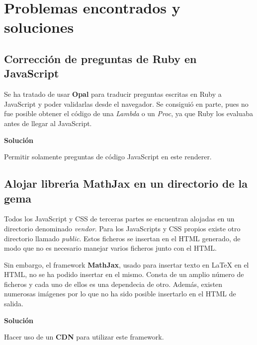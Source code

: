 \section{Problemas encontrados y soluciones}
\label{4:sec:1}

\subsection{Correcci\'on de preguntas de Ruby en JavaScript}
\label{subsec:4.1.2}
\bigskip

Se ha tratado de usar {\bfseries Opal} para traducir preguntas escritas en Ruby a JavaScript y poder validarlas desde el navegador.
Se consigui\'o en parte, pues no fue posible obtener el c\'odigo de una \textit{Lambda} o un \textit{Proc}, ya que Ruby los evaluaba antes de llegar al
JavaScript.
\bigskip

{\normalsize {\bfseries Soluci\'on}}
\bigskip

Permitir solamente preguntas de c\'odigo JavaScript en este renderer.

\subsection{Alojar librer\'{\i}a MathJax en un directorio de la gema}
\label{subsec:4.1.3}
\bigskip

Todos los JavaScript y CSS de terceras partes se encuentran alojadas en un directorio denominado \textit{vendor}. Para los JavaScripts y CSS
propios existe otro directorio llamado \textit{public}. Estos ficheros se insertan en el HTML generado, de modo que no es necesario manejar varios
ficheros junto con el HTML. 

Sin embargo, el framework {\bfseries MathJax}, usado para insertar texto en LaTeX en el HTML, no se ha podido insertar en el mismo. Consta de un
amplio n\'umero de ficheros y cada uno de ellos es una dependecia de otro. Adem\'as, existen numerosas im\'agenes por lo que no ha sido posible insertarlo
en el HTML de salida.
\bigskip

{\normalsize {\bfseries Soluci\'on}}
\bigskip

Hacer uso de un {\bfseries CDN} para utilizar este framework.
